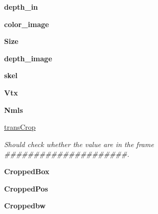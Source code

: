 \begin{DoxyCompactItemize}
{\bfseries depth\+\_\+in}
\item 
\mbox{\label{class_r_g_b_d_1_1_r_g_b_d_a1e5163fcd76a2c95710ec20187a0acd8}} 
{\bfseries color\+\_\+image}
\item 
\mbox{\label{class_r_g_b_d_1_1_r_g_b_d_ae1cfeac789474f32593196e41f6be6fa}} 
{\bfseries Size}
\item 
\mbox{\label{class_r_g_b_d_1_1_r_g_b_d_a6462c5a17e18aee53b5379fb3a331444}} 
{\bfseries depth\+\_\+image}
\item 
\mbox{\label{class_r_g_b_d_1_1_r_g_b_d_aeecce03148f74fcdc0e7308924f2bcd5}} 
{\bfseries skel}
\item 
\mbox{\label{class_r_g_b_d_1_1_r_g_b_d_acf6e4ef08aeff1a0c492d8e761b1b8fc}} 
{\bfseries Vtx}
\item 
\mbox{\label{class_r_g_b_d_1_1_r_g_b_d_a2926616892109cf5dc957cf88f44a82f}} 
{\bfseries Nmls}
\item 
\mbox{\label{class_r_g_b_d_1_1_r_g_b_d_aa675c35b936cca72cbf9859b397db76b}} 
\hyperlink{class_r_g_b_d_1_1_r_g_b_d_aa675c35b936cca72cbf9859b397db76b}{trans\+Crop}
\begin{DoxyCompactList}\small\item\em Should check whether the value are in the frame \#\#\#\#\#\#\#\#\#\#\#\#\#\#\#\#\#\#\#\#\#. \end{DoxyCompactList}\item 
\mbox{\label{class_r_g_b_d_1_1_r_g_b_d_ac83ddaecc4b781c06e501638a8d5354e}} 
{\bfseries Cropped\+Box}
\item 
\mbox{\label{class_r_g_b_d_1_1_r_g_b_d_abcef839070008867031f8ca1039017a2}} 
{\bfseries Cropped\+Pos}
\item 
\mbox{\label{class_r_g_b_d_1_1_r_g_b_d_a3358964e5f345b88703dfc4833623e48}} 
{\bfseries Croppedbw}
\item 
\mbox{\label{class_r_g_b_d_1_1_r_g_b_d_a25864624766632d42831177eeb6d8ed5}} 

\end{DoxyCompactItemize}
